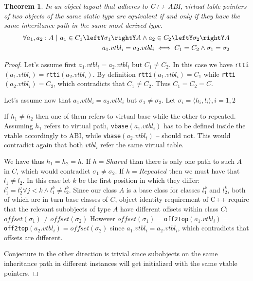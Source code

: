\documentclass[preprint]{sigplanconf}
\makeatletter
\DeclareRobustCommand{\code}[1]{{\lstinline[breaklines=false,escapechar=@]{#1}}}
\newtheorem{theorem}{Theorem}
\makeatother
\begin{document}
\begin{theorem}
In an object layout that adheres to C++ ABI, virtual table pointers of two 
objects of the same static type are equivalent if and only if they have the same 
inheritance path in the same most-derived type.
\begin{eqnarray*}
    \forall a_1, a_2 : A\ |\ a_1\in C_1\leftY\sigma_1\rightY A \wedge a_2\in C_2\leftY\sigma_2\rightY A \\
    a_1.vtbl_i = a_2.vtbl_i \iff C_1 = C_2 \wedge \sigma_1 = \sigma_2
\end{eqnarray*}
\end{theorem}
\begin{proof}
Let's assume first $a_1.vtbl_i = a_2.vtbl_i$ but $C_1 \neq C_2$. In this case we 
have \code{rtti}$(a_1.vtbl_i) = $\code{rtti}$(a_2.vtbl_i)$. By definition 
\code{rtti}$(a_1.vtbl_i) = C_1$ while \code{rtti}$(a_2.vtbl_i) = C_2$, which 
contradicts that $C_1 \neq C_2$. Thus $C_1 = C_2 = C$.

Let's assume now that $a_1.vtbl_i = a_2.vtbl_i$ but $\sigma_1 \neq \sigma_2$. 
Let $\sigma_i=\langle h_i,l_i\rangle,i=1,2$ 

If $h_1 \neq h_2$ then one of them refers to virtual base while the other to 
repeated. Assuming $h_1$ refers to virtual path, \code{vbase}$(a_1.vtbl_i)$ has 
to be defined inside the vtable accordingly to ABI, while 
\code{vbase}$(a_2.vtbl_i)$ -- should not. This would contradict again that both 
$vtbl_i$ refer the same virtual table.

We have thus $h_1 = h_2 = h$. If $h = Shared$ than there is only one path to 
such $A$ in $C$, which would contradict $\sigma_1 \neq \sigma_2$. 
If $h = Repeated$ then we must have that $l_1 \neq l_2$. In this case let $k$ be 
the first position in which they differ: 
$l_1^j=l_2^j \forall j<k \wedge l_1^k\neq l_2^k$. Since our class $A$ is a base 
class for classes $l_1^k$ and $l_2^k$, both of which are in turn base classes of 
$C$, object identity requirement of C++ require that the relevant subobjects of 
type $A$ have different offsets within class $C$: 
$offset(\sigma_1)\neq offset(\sigma_2)$ However 
$offset(\sigma_1)=$\code{off2top}$(a_1.vtbl_i)=$\code{off2top}$(a_2.vtbl_i)=offset(\sigma_2)$ 
since $a_1.vtbl_i = a_2.vtbl_i$, which contradicts that offsets are different.

Conjecture in the other direction is trivial since subobjects on the same 
inheritance path in different instances will get initialized with the same 
vtable pointers.
\end{proof}
\end{document}
